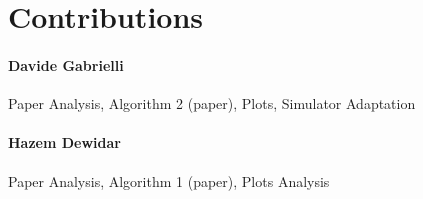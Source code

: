 \section*{Contributions}

\paragraph{Davide Gabrielli} Paper Analysis, Algorithm 2 (paper), Plots, Simulator Adaptation

\paragraph{Hazem Dewidar} Paper Analysis, Algorithm 1 (paper), Plots Analysis


